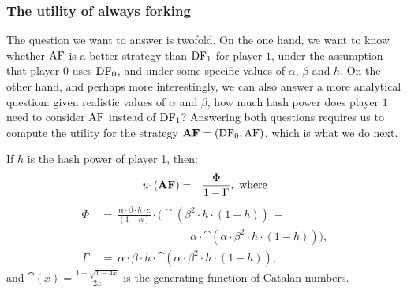 \subsubsection{The utility of always forking}
The question we want to answer is twofold. On the one hand, we want to know whether $\text{\rm AF}$ is a better strategy than $\text{\rm DF}_1$ for player $1$, under the assumption that player $0$ uses $\text{\rm DF}_0$, and under some specific values of $\alpha$, $\beta$ and $h$. 
On the other hand, and 
perhaps more interestingly, we can also answer a more analytical question: given realistic values of $\alpha$ and $\beta$, how much hash power does player $1$ need to consider $\text{\rm AF}$ instead of $\text{\rm DF}_1$? 
Answering both questions requires us to compute the utility for the  strategy $\text{\rm {\bf AF}}=(\text{\rm DF}_0,\text{\rm AF})$, which is what we do next. 

\begin{theorem}\label{thm:always_fork}
If $h$ is the hash power of player 1, then:
\begin{eqnarray*}
u_1(\text{\rm {\bf AF}}) &=& \frac{\Phi}{1-\Gamma}, \mbox{ where}
\end{eqnarray*}
\begin{align*}
\Phi & \ = \ \frac{\alpha \cdot \beta  \cdot h  \cdot c}{(1-\alpha)} \cdot  \big(\cat(\beta^2  \cdot h  \cdot (1-h)) \ -\\ 
& \hspace{100pt} \alpha\cdot \cat(\alpha \cdot \beta^2  \cdot h  \cdot (1-h))\big),\\
\Gamma & \ = \ \alpha \cdot \beta \cdot h \cdot \cat(\alpha\cdot \beta^2 \cdot h \cdot (1-h)),
\end{align*}
and $\cat(x) = \frac{1-\sqrt{1-4x}}{2x}$ is the generating function of Catalan numbers.
\end{theorem}



